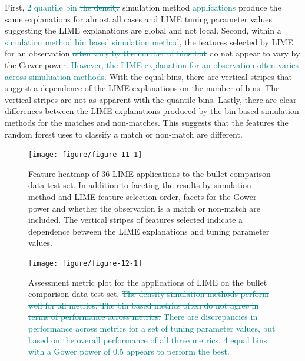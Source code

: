 \documentclass[AMS,STIX2COL]{WileyNJD-v2}\usepackage[]{graphicx}\usepackage[]{color}
\newenvironment{knitrout}{}{} %
\newcommand{\kge}[1]{\textcolor{teal}{#1}}
\begin{document}
First, \kge{2 quantile bin \sout{the density}} simulation method \kge{applications} produce the same explanations for almost all cases and LIME tuning parameter values suggesting the LIME explanations are global and not local. Second, within a \kge{simulation method \sout{bin based simulation method}}, the features selected by LIME for an observation \kge{\sout{often vary by the number of bins but}} do not appear to vary by the Gower power. \kge{However, the LIME explanation for an observation often varies across simuluation methods.} With the equal bins, there are vertical stripes that suggest a dependence of the LIME explanations on the number of bins. The vertical stripes are not as apparent with the quantile bins. Lastly, there are clear differences between the LIME explanations produced by the bin based simulation methods for the matches and non-matches. This suggests that the features the random forest uses to classify a match or non-match are different. 

\begin{figure}[!thp]
\begin{knitrout}
\color{fgcolor}

{\centering \texttt{[image: figure/figure-11-1]} 

}



\end{knitrout}
\caption{Feature heatmap of 36 LIME applications to the bullet comparison data test set. In addition to faceting the results by simulation method and LIME feature selection order, facets for the Gower power and whether the observation is a match or non-match are included. The vertical stripes of features selected indicate a dependence between the LIME explanations and tuning parameter values.}
\label{fig:figure-11}

\vspace*{\floatsep}

\begin{knitrout}
\color{fgcolor}

{\centering \texttt{[image: figure/figure-12-1]} 

}



\end{knitrout}
\caption{Assessment metric plot for the applications of LIME on the bullet comparison data test set. \kge{\sout{The density simulation methods perform well for all metrics. The bin based metrics often do not agree in terms of performance across metrics.} There are discrepancies in performance across metrics for a set of tuning parameter values, but based on the overall performance of all three metrics, 4 equal bins with a Gower power of 0.5 appears to perform the best.}}
\label{fig:figure-12}
\end{figure}
\end{document}
